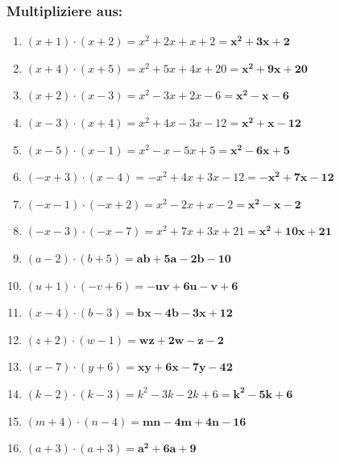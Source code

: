 \documentclass[a4paper,10pt]{article} %
\begin{document}
\subsubsection{Multipliziere aus:} %

\begin{enumerate}[label=\alph*)]

  \item \((x + 1) \cdot (x + 2) =
    x^2 + 2x + x + 2 =
    \mathbf{x^2 + 3x + 2}\) %

  \item \((x + 4) \cdot (x + 5) =
    x^2 + 5x + 4x + 20 =
    \mathbf{x^2 + 9x + 20}\) %

  \item \((x + 2) \cdot (x - 3) =
    x^2 - 3x + 2x - 6 =
    \mathbf{x^2 - x - 6}\) %

  \item \((x - 3) \cdot (x + 4) =
    x^2 + 4x - 3x - 12 =
    \mathbf{x^2 + x - 12}\) %

  \item \((x - 5) \cdot (x - 1) =
    x^2 - x - 5x + 5 =
    \mathbf{x^2 - 6x + 5}\) %

  \item \((-x + 3) \cdot (x - 4) =
    -x^2 + 4x + 3x - 12 =
    \mathbf{-x^2 + 7x - 12}\) %

  \item \((-x - 1) \cdot (-x + 2) =
    x^2 - 2x + x - 2 =
    \mathbf{x^2 - x - 2}\) %

  \item \((-x - 3) \cdot (-x - 7) =
    x^2 + 7x + 3x + 21 =
    \mathbf{x^2 + 10x + 21}\) %

  \item \((a - 2) \cdot (b + 5) =
    \mathbf{ab + 5a - 2b - 10}\) %

  \item \((u + 1) \cdot (-v + 6) =
    \mathbf{-uv + 6u - v + 6}\) %

  \item \((x - 4) \cdot (b - 3) =
    \mathbf{bx -4b - 3x + 12}\) %

  \item \((z + 2) \cdot (w - 1) =
    \mathbf{wz + 2w - z - 2}\) %

  \item \((x - 7) \cdot (y + 6) =
    \mathbf{xy + 6x - 7y - 42}\) %

  \item \((k - 2) \cdot (k - 3) =
    k^2 - 3k - 2k + 6 =
    \mathbf{k^2 - 5k + 6}\) %

  \item \((m + 4) \cdot (n - 4) =
    \mathbf{mn - 4m + 4n - 16}\) %

  \item \((a + 3) \cdot (a + 3) =
    \mathbf{a^2 + 6a + 9}\) %

\end{enumerate}
\end{document}
